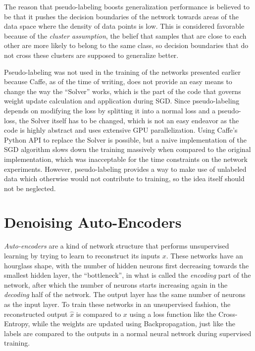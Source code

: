 The reason that pseudo-labeling boosts generalization performance is believed to be that it pushes the decision boundaries of the network towards areas of the data space where the density of data points is low. This is considered favorable because of the \textit{cluster assumption}, the belief that samples that are close to each other are more likely to belong to the same class, so decision boundaries that do not cross these clusters are supposed to generalize better. \cite{pseudo_label}

Pseudo-labeling was not used in the training of the networks presented earlier because Caffe, as of the time of writing, does not provide an easy means to change the way the ``Solver'' works, which is the part of the code that governs weight update calculation and application during SGD. Since pseudo-labeling depends on modifying the loss by splitting it into a normal loss and a pseudo-loss, the Solver itself has to be changed, which is not an easy endeavor as the code is highly abstract and uses extensive GPU parallelization. Using Caffe's Python API to replace the Solver is possible, but a naive implementation of the SGD algorithm slows down the training massively when compared to the original implementation, which was inacceptable for the time constraints on the network experiments. However, pseudo-labeling provides a way to make use of unlabeled data which otherwise would not contribute to training, so the idea itself should not be neglected.


	\section{Denoising Auto-Encoders}

\textit{Auto-encoders} are a kind of network structure that performs unsupervised learning by trying to learn to reconstruct its inputs $x$. These networks have an hourglass shape, with the number of hidden neurons first decreasing towards the smallest hidden layer, the ``bottleneck'', in what is called the \textit{encoding} part of the network, after which the number of neurons starts increasing again in the \textit{decoding} half of the network. The output layer has the same number of neurons as the input layer. To train these networks in an unsupervised fashion, the reconstructed output $\hat{x}$ is compared to $x$ using a loss function like the Cross-Entropy, while the weights are updated using Backpropagation, just like the labels are compared to the outputs in a normal neural network during supervised training.

